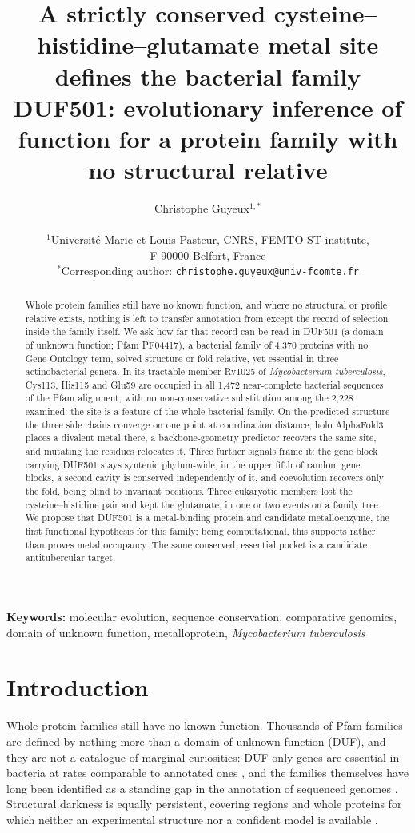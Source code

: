 \documentclass[11pt,a4paper]{article}
\title{A strictly conserved cysteine--histidine--glutamate metal site defines the bacterial family DUF501: evolutionary inference of function for a protein family with no structural relative}
\author{Christophe Guyeux$^{1,*}$\\[6pt]
  \parbox{\textwidth}{\centering\small
    $^{1}$Universit\'e Marie et Louis Pasteur, CNRS, FEMTO-ST institute,\\
    F-90000 Belfort, France\\[3pt]
    $^{*}$Corresponding author: \texttt{christophe.guyeux@univ-fcomte.fr}
  }
}
\date{}
\newcommand{\mtb}{\textit{Mycobacterium tuberculosis}}
\begin{document}
\linenumbers
\maketitle

\begin{abstract}
\noindent
Whole protein families still have no known function, and where no structural or profile relative exists, nothing is left to transfer annotation from except the record of selection inside the family itself. We ask how far that record can be read in DUF501 (a domain of unknown function; Pfam PF04417), a bacterial family of 4{,}370 proteins with no Gene Ontology term, solved structure or fold relative, yet essential in three actinobacterial genera. In its tractable member Rv1025 of \mtb{}, Cys113, His115 and Glu59 are occupied in all 1{,}472 near-complete bacterial sequences of the Pfam alignment, with no non-conservative substitution among the 2{,}228 examined: the site is a feature of the whole bacterial family. On the predicted structure the three side chains converge on one point at coordination distance; holo AlphaFold3 places a divalent metal there, a backbone-geometry predictor recovers the same site, and mutating the residues relocates it. Three further signals frame it: the gene block carrying DUF501 stays syntenic phylum-wide, in the upper fifth of random gene blocks, a second cavity is conserved independently of it, and coevolution recovers only the fold, being blind to invariant positions. Three eukaryotic members lost the cysteine--histidine pair and kept the glutamate, in one or two events on a family tree. We propose that DUF501 is a metal-binding protein and candidate metalloenzyme, the first functional hypothesis for this family; being computational, this supports rather than proves metal occupancy. The same conserved, essential pocket is a candidate antitubercular target.
\end{abstract}

\textbf{Keywords:} molecular evolution, sequence conservation, comparative genomics, domain of unknown function, metalloprotein, \textit{Mycobacterium tuberculosis}

\section{Introduction}

Whole protein families still have no known function. Thousands of Pfam families are defined by nothing more than a domain of unknown function (DUF), and they are not a catalogue of marginal curiosities: DUF-only genes are essential in bacteria at rates comparable to annotated ones \citep{goodacre2014dufessential}, and the families themselves have long been identified as a standing gap in the annotation of sequenced genomes \citep{bateman2010dufs}. Structural darkness is equally persistent, covering regions and whole proteins for which neither an experimental structure nor a confident model is available \citep{perdigao2015darkproteome}.
\end{document}
